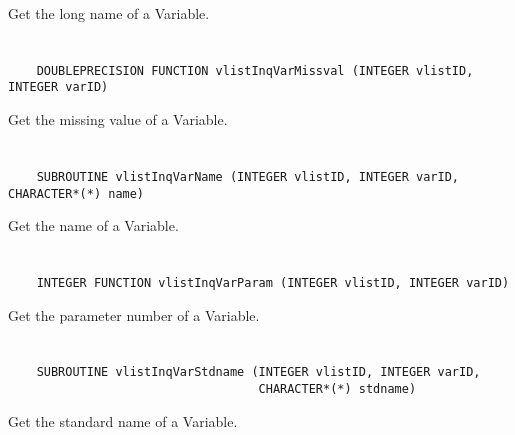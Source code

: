 Get the long name of a Variable.


\section*{\tt {}}

\begin{verbatim}
    DOUBLEPRECISION FUNCTION vlistInqVarMissval (INTEGER vlistID, INTEGER varID)
\end{verbatim}

Get the missing value of a Variable.


\section*{\tt {}}

\begin{verbatim}
    SUBROUTINE vlistInqVarName (INTEGER vlistID, INTEGER varID, CHARACTER*(*) name)
\end{verbatim}

Get the name of a Variable.


\section*{\tt {}}

\begin{verbatim}
    INTEGER FUNCTION vlistInqVarParam (INTEGER vlistID, INTEGER varID)
\end{verbatim}

Get the parameter number of a Variable.


\section*{\tt {}}

\begin{verbatim}
    SUBROUTINE vlistInqVarStdname (INTEGER vlistID, INTEGER varID,
                                   CHARACTER*(*) stdname)
\end{verbatim}

Get the standard name of a Variable.


\section*{\tt {}}

